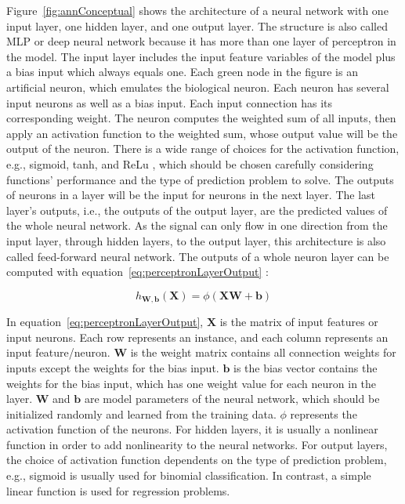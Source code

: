 \documentclass[english]{kththesis}
\begin{document}
Figure~\ref{fig:annConceptual} shows the architecture of a neural network with one input layer, one hidden layer, and one output layer. The structure is also called MLP or deep neural network because it has more than one layer of perceptron in the model. The input layer includes the input feature variables of the model plus a bias input which always equals one. Each green node in the figure is an artificial neuron, which emulates the biological neuron. Each neuron has several input neurons as well as a bias input. Each input connection has its corresponding weight. The neuron computes the weighted sum of all inputs, then apply an activation function to the weighted sum, whose output value will be the output of the neuron. There is a wide range of choices for the activation function, e.g., sigmoid, tanh, and ReLu \cite{geron_handson_ml}, which should be chosen carefully considering functions' performance and the type of prediction problem to solve. The outputs of neurons in a layer will be the input for neurons in the next layer. The last layer's outputs, i.e., the outputs of the output layer, are the predicted values of the whole neural network. As the signal can only flow in one direction from the input layer, through hidden layers, to the output layer, this architecture is also called feed-forward neural network. The outputs of a whole neuron layer can be computed with equation~\ref{eq:perceptronLayerOutput} \cite{geron_handson_ml}:

\begin{equation}
    h_{\mathbf{W},\mathbf{b}}(\mathbf{X})=\phi(\mathbf{XW}+\boldsymbol{\mathbf{b}})
    \label{eq:perceptronLayerOutput}
\end{equation}

In equation~\ref{eq:perceptronLayerOutput}, $\mathbf{X}$ is the matrix of input features or input neurons. Each row represents an instance, and each column represents an input feature/neuron. $\mathbf{W}$ is the weight matrix contains all connection weights for inputs except the weights for the bias input. $\mathbf{b}$ is the bias vector contains the weights for the bias input, which has one weight value for each neuron in the layer. $\mathbf{W}$ and $\mathbf{b}$ are model parameters of the neural network, which should be initialized randomly and learned from the training data. $\phi$ represents the activation function of the neurons. For hidden layers, it is usually a nonlinear function in order to add nonlinearity to the neural networks. For output layers, the choice of activation function dependents on the type of prediction problem, e.g., sigmoid is usually used for binomial classification. In contrast, a simple linear function is used for regression problems.
\end{document}
